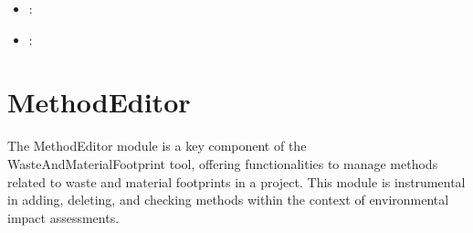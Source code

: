 \documentclass[letterpaper,10pt,english]{sphinxmanual}
\begin{document}
\begin{itemize}
\item {} 
\sphinxAtStartPar
{}:

\end{itemize}

\begin{sphinxVerbatim}[commandchars=\\\{\}]
 
\end{sphinxVerbatim}
\begin{itemize}
\item {} 
\sphinxAtStartPar
{}:

\end{itemize}

\begin{sphinxVerbatim}[commandchars=\\\{\}]
 
\end{sphinxVerbatim}

\sphinxstepscope


\section{MethodEditor}
\label{\detokenize{MethodEditor:methodeditor}}\label{\detokenize{MethodEditor::doc}}
\sphinxAtStartPar
The MethodEditor module is a key component of the WasteAndMaterialFootprint tool, offering functionalities
to manage methods related to waste and material footprints in a project. This module is instrumental in
adding, deleting, and checking methods within the context of environmental impact assessments.
\end{document}
